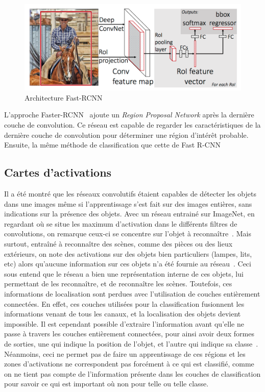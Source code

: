 \begin{figure}%
\includegraphics[width=\columnwidth]{figures/fast-rcnn.png}%
\caption{Architecture Fast-RCNN~\cite{girshick2015fast}}%
\label{fig:fastrcnn}%
\end{figure}

L'approche Faster-RCNN~\cite{ren2015faster} ajoute un \textit{Region Proposal Network} après la dernière couche de convolution.
Ce réseau est capable de regarder les caractéristiques de la dernière couche de convolution pour déterminer une région d'intérêt probable.
Ensuite, la même méthode de classification que cette de Fast R-CNN 



\subsection{Cartes d'activations}
\label{sec:cartedactivation}

Il a été montré que les réseaux convolutifs étaient capables de détecter les objets dans une images même si l'apprentissage s'est fait sur des images entières, sans indications sur la présence des objets.
Avec un réseau entrainé sur ImageNet, en regardant où se situe les maximum d'activation dans le différents filtres de convolutions, on remarque ceux-ci se concentre sur l'objet à reconnaître~\cite{le2013building}.
Mais surtout, entraîné à reconnaître des scènes, comme des pièces ou des lieux extérieurs, on note des activations sur des objets bien particuliers (lampes, lits, etc) alors qu'aucune information sur ces objets n'a été fournie au réseau~\cite{zhou2014object}. 
Ceci sous entend que le réseau a bien une représentation interne de ces objets, lui permettant de les reconnaître, et de reconnaître les scènes.
Toutefois, ces informations de localisation sont perdues avec l'utilisation de couches entièrement connectées.
En effet, ces couches utilisées pour la classification fusionnent les informations venant de tous les canaux, et la localisation des objets devient impossible.
Il est cependant possible d'extraire l'information avant qu'elle ne passe à travers les couches entièrement connectées, pour ainsi avoir deux formes de sorties, une qui indique la position de l'objet, et l'autre qui indique sa classe~\cite{zhou2016learning}.
Néanmoins, ceci ne permet pas de faire un apprentissage de ces régions et les zones d'activations ne correspondent pas forcément à ce qui est classifié, comme on ne tient pas compte de l'information présente dans les couches de classification pour savoir ce qui est important où non pour telle ou telle classe.

